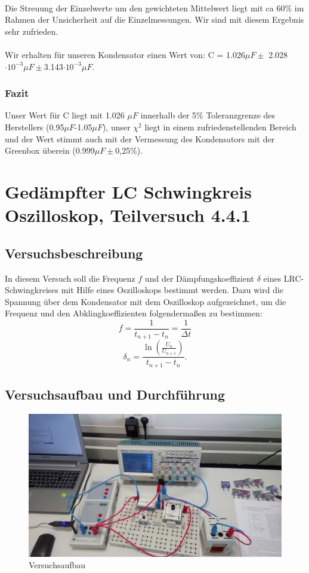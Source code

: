 \documentclass[12pt,a4paper]{article}
\begin{document}
\\Die Streuung der Einzelwerte um den gewichteten Mittelwert liegt mit ca 60\% im Rahmen der Unsicherheit auf die Einzelmessungen. Wir sind mit diesem Ergebnis sehr zufrieden.\\
\\Wir erhalten für unseren Kondensator einen Wert von: C = 1.026$\mu F \pm$ 2.028$\cdot 10^{-3}\mu F \pm$3.143$\cdot 10^{-3}\mu F$. 

\subsubsection{Fazit}
Unser Wert für C liegt mit 1.026 $\mu F$ innerhalb der 5\% Toleranzgrenze des Herstellers (0.95$\mu F$-1.05$\mu F$), unser $\chi^2$ liegt in einem zufriedenstellenden Bereich und der Wert stimmt auch mit der Vermessung des Kondensators mit der Greenbox überein (0.999$\mu F \pm$0,25\%).\\

\section{Gedämpfter LC Schwingkreis Oszilloskop, Teilversuch 4.4.1}
\subsection{Versuchsbeschreibung}
In diesem Versuch soll die Frequenz $f$ und der Dämpfungskoeffizient $\delta$ eines LRC-Schwingkreises mit Hilfe eines Oszilloskops bestimmt werden. \newline
Dazu wird die Spannung über dem Kondensator mit dem Oszilloskop aufgezeichnet, um die Frequenz und den Abklingkoeffizienten folgendermaßen zu bestimmen:
\begin{equation}
f=\frac{1}{t_{n+1}-t_n}=\frac{1}{\Delta t}
\end{equation}
\begin{equation}
\delta_n=\frac{\ln{(\frac{U_n}{U_{n+1}})}}{t_{n+1}-t_n}.
\end{equation}


\subsection{Versuchsaufbau und Durchführung}

\begin{figure}[H]
\centering
\includegraphics[scale=0.27]{ArbeitsplatzE_1.jpg}
\caption{Versuchsaufbau}
\end{figure}
\end{document}
